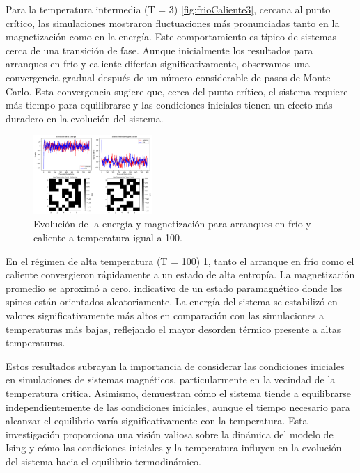 \documentclass[twocolumn]{article}
\begin{document}
Para la temperatura intermedia (T = 3) \ref{fig:frioCaliente3}, cercana al punto crítico, las simulaciones mostraron fluctuaciones más pronunciadas tanto en la magnetización como en la energía. Este comportamiento es típico de sistemas cerca de una transición de fase. Aunque inicialmente los resultados para arranques en frío y caliente diferían significativamente, observamos una convergencia gradual después de un número considerable de pasos de Monte Carlo. Esta convergencia sugiere que, cerca del punto crítico, el sistema requiere más tiempo para equilibrarse y las condiciones iniciales tienen un efecto más duradero en la evolución del sistema.

\begin{figure}[hbt]
    \centering
    \includegraphics[width=0.4\textwidth]{figures/frioCaliente100.png}
    \caption{Evolución de la energía y magnetización para arranques en frío y caliente a temperatura igual a 100.}
    \label{fig:frioCaliente100}
\end{figure}

En el régimen de alta temperatura (T = 100) \ref{fig:frioCaliente100}, tanto el arranque en frío como el caliente convergieron rápidamente a un estado de alta entropía. La magnetización promedio se aproximó a cero, indicativo de un estado paramagnético donde los spines están orientados aleatoriamente. La energía del sistema se estabilizó en valores significativamente más altos en comparación con las simulaciones a temperaturas más bajas, reflejando el mayor desorden térmico presente a altas temperaturas.

Estos resultados subrayan la importancia de considerar las condiciones iniciales en simulaciones de sistemas magnéticos, particularmente en la vecindad de la temperatura crítica. Asimismo, demuestran cómo el sistema tiende a equilibrarse independientemente de las condiciones iniciales, aunque el tiempo necesario para alcanzar el equilibrio varía significativamente con la temperatura. Esta investigación proporciona una visión valiosa sobre la dinámica del modelo de Ising y cómo las condiciones iniciales y la temperatura influyen en la evolución del sistema hacia el equilibrio termodinámico.
\end{document}
